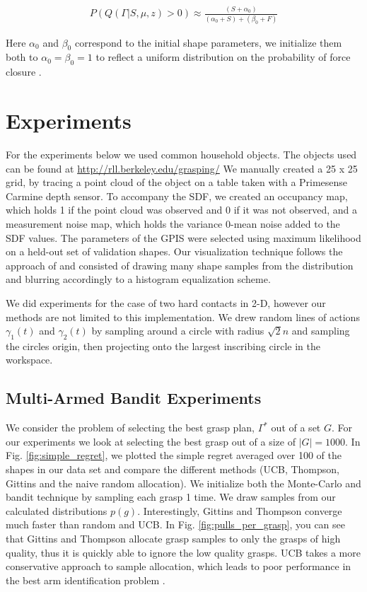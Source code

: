 \documentclass[letterpaper, 10 pt, conference]{ieeeconf}  %
\begin{document}
\vspace{-2ex}
\begin{align}\label{eq:shape_sampling}
P(Q(\Gamma|S,\mu,z) > 0) \approx \frac{(S + \alpha_0)}{(\alpha_0 + S) +( \beta_0 + F)}
\end{align}

Here $\alpha_0$ and $\beta_0$ correspond to the initial shape parameters, we initialize them both to $\alpha_0 = \beta_0 = 1$ to reflect a uniform distribution on the probability of force closure . 


\section{Experiments}
For the experiments below we used common household objects.  The objects used can be found at \url{http://rll.berkeley.edu/grasping/} We manually created a 25 x 25 grid, by tracing a point cloud of the object on a table taken with a Primesense Carmine depth sensor. To accompany the SDF, we created an occupancy map, which holds 1 if the point cloud was observed and 0 if it was not observed, and a measurement noise map, which holds the variance 0-mean noise added to the SDF values. The parameters of the GPIS were selected using maximum likelihood on a held-out set of validation shapes. Our visualization technique follows the approach of \cite{mahler2015opt} and consisted of drawing many shape samples from the distribution and blurring accordingly to a histogram equalization scheme. 

We did experiments for the case of two hard contacts in 2-D, however our methods are not limited to this implementation. We drew random lines of actions $\gamma_1(t)$ and $\gamma_2(t)$ by sampling around a circle with radius $\sqrt{2}n$ and sampling the circles origin, then projecting onto the largest inscribing circle in the workspace. 





\subsection{Multi-Armed Bandit Experiments}

We consider the problem of selecting the best grasp plan, $\Gamma^*$ out of a set $G$. For our experiments we look at selecting the best grasp out of a size of $|G| = 1000$. In Fig. \ref{fig:simple_regret}, we plotted the simple regret averaged over 100 of the shapes in our data set and compare the different methods (UCB, Thompson, Gittins and the naive random allocation). We initialize both the Monte-Carlo and bandit technique by sampling each grasp 1 time. We draw samples from our calculated distributions $p(g)$.  Interestingly, Gittins and Thompson converge much faster than random and UCB. In Fig. \ref{fig:pulls_per_grasp}, you can see that Gittins and Thompson allocate grasp samples to only the grasps of high quality, thus it is quickly able to ignore the low quality grasps. UCB takes a more conservative approach to sample allocation, which leads to poor performance in the best arm identification problem \cite{bubeck2009pure}.
\end{document}
